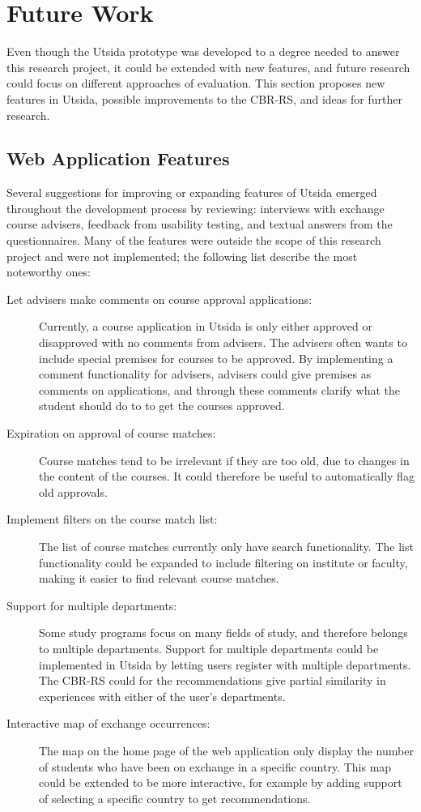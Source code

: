 \section{Future Work}

Even though the Utsida prototype was developed to a degree needed to answer this research project, it could be extended with new features, and future research could focus on different approaches of evaluation. This section proposes new features in Utsida, possible improvements to the CBR-RS, and ideas for further research.

\subsection{Web Application Features}

Several suggestions for improving or expanding features of Utsida emerged throughout the development process by reviewing: interviews with exchange course advisers, feedback from usability testing, and textual answers from the questionnaires. Many of the features were outside the scope of this research project and were not implemented; the following list describe the most noteworthy ones:

\begin{description} 
    \item[Let advisers make comments on course approval applications:] Currently, a course application in Utsida is only either approved or disapproved with no comments from advisers. The advisers often wants to include special premises for courses to be approved. By implementing a comment functionality for advisers, advisers could give premises as comments on applications, and through these comments clarify what the student should do to to get the courses approved.
    \item[Expiration on approval of course matches:] Course matches tend to be irrelevant if they are too old, due to changes in the content of the courses. It could therefore be useful to automatically flag old approvals.
    \item[Implement filters on the course match list:] The list of course matches currently only have search functionality. The list functionality could be expanded to include filtering on institute or faculty, making it easier to find relevant course matches.
    \item[Support for multiple departments:] Some study programs focus on many fields of study, and therefore belongs to multiple departments. Support for multiple departments could be implemented in Utsida by letting users register with multiple departments. The CBR-RS could for the recommendations give partial similarity in experiences with either of the user's departments.
    \item[Interactive map of exchange occurrences:] The map on the home page of the web application only display the number of students who have been on exchange in a specific country. This map could be extended to be more interactive, for example by adding support of selecting a specific country to get recommendations.
\end{description}



